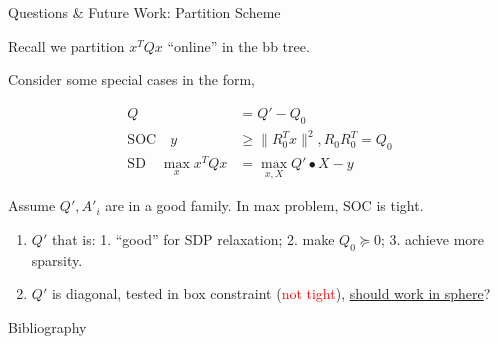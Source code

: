 \documentclass[aspectratio=1610, 10pt]{beamer}
\newcommand{\red}[1]{\textcolor{red}{#1}}
\begin{document}
\begin{frame}[allowframebreaks]{Questions \& Future Work: Partition Scheme}

  Recall we partition \(x^TQx\) ``online'' in the bb tree.

  Consider some special cases in the form,

  \begin{align*}
    Q                                & = Q' - Q_0                       \\
    \text{SOC} \quad   y             & \ge \|R_0^Tx\|^2, R_0R_0^T = Q_0 \\
    \text{SD} \quad   \max_{x} x^TQx & = \max_{x, X} Q'\bullet X - y
  \end{align*}

  Assume \(Q', A'_i\) are in a good family.
  In max problem, \(\text{SOC}\) is tight.

  \begin{enumerate}
    \item \(Q'\) that is: 1. ``good'' for SDP relaxation; 2. make \(Q_0 \succeq 0\); 3. achieve more sparsity.
    \item \(Q'\) is diagonal, tested in box constraint (\red{not tight}), \underline{should work in sphere}?
  \end{enumerate}


\end{frame}
\begin{frame}[allowframebreaks]{Bibliography}
  
  
\end{frame}
\end{document}
